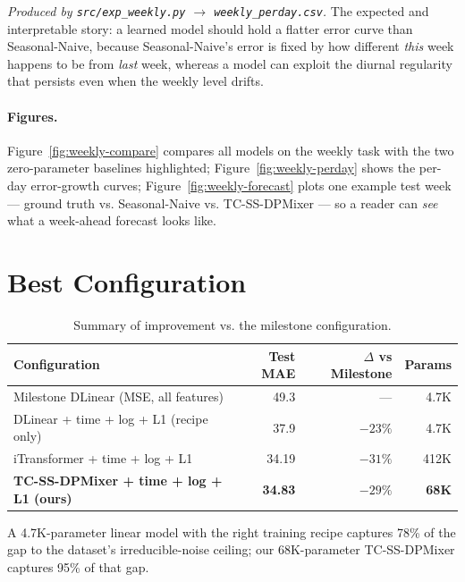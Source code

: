 \documentclass[11pt,letterpaper]{article}
\begin{document}
\textit{Produced by \texttt{src/exp\_weekly.py} $\rightarrow$
\texttt{weekly\_perday.csv}.} The expected and interpretable story: a
learned model should hold a flatter error curve than Seasonal-Naive,
because Seasonal-Naive's error is fixed by how different \emph{this} week
happens to be from \emph{last} week, whereas a model can exploit the
diurnal regularity that persists even when the weekly level drifts.

\paragraph{Figures.} Figure~\ref{fig:weekly-compare} compares all models
on the weekly task with the two zero-parameter baselines highlighted;
Figure~\ref{fig:weekly-perday} shows the per-day error-growth curves;
Figure~\ref{fig:weekly-forecast} plots one example test week --- ground
truth vs. Seasonal-Naive vs. TC-SS-DPMixer --- so a reader can \emph{see}
what a week-ahead forecast looks like.

\section{Best Configuration}

\begin{table}[H]
\centering
\small
\begin{tabular}{lrrr}
\toprule
\textbf{Configuration} & \textbf{Test MAE} & \textbf{$\Delta$ vs Milestone} & \textbf{Params} \\
\midrule
Milestone DLinear (MSE, all features)         & 49.3           & ---            & 4.7K \\
DLinear + time + log + L1 (recipe only)       & 37.9           & $-23\%$        & 4.7K \\
iTransformer + time + log + L1                & 34.19          & $-31\%$        & 412K \\
\textbf{TC-SS-DPMixer + time + log + L1 (ours)} & \textbf{34.83} & \textbf{$-29\%$} & \textbf{68K} \\
\bottomrule
\end{tabular}
\caption{Summary of improvement vs. the milestone configuration.}
\end{table}

A 4.7K-parameter linear model with the right training recipe captures
78\% of the gap to the dataset's irreducible-noise ceiling; our
68K-parameter TC-SS-DPMixer captures 95\% of that gap.
\end{document}
